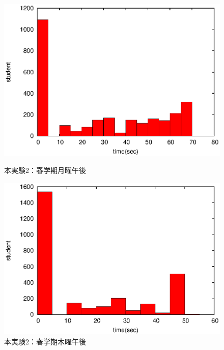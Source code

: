 \documentclass[a4paper,10pt]{jarticle}
\begin{document}
\fi

\begin{figure}[htpb]                        
\begin{minipage} {0.5\hsize}                             
\begin{center}                              
\includegraphics[bb=0 0 390 248,clip,width=\hsize]{oMo345_2_hist.eps}   
\caption{本実験2：春学期月曜午後}                              
\label{oMo345_2}                                
\end{center}                                    
\end{minipage}                                 
\begin{minipage}{0.5\hsize}                                            
\begin{center}                              
\includegraphics[bb=0 0 390 248,clip,width=\hsize]{oTh345_2_hist.eps}   
\caption{本実験2：春学期木曜午後}                              
\label{oTh345_2}                                
\end{center}                                    
\end{minipage}                                 
\end{figure}                                 
\end{document}
